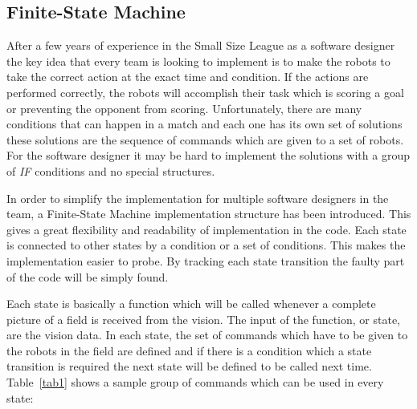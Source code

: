 \documentclass[runningheads]{llncs}
\begin{document}
\subsection{Finite-State Machine} 
After a few years of experience in the Small Size League as a software designer the key idea that every team is looking to implement is to make the robots to take the correct action at the exact time and condition. If the actions are performed correctly, the robots will accomplish their task which is scoring a goal or preventing the opponent from scoring. Unfortunately, there are many conditions that can happen in a match and each one has its own set of solutions these solutions are the sequence of commands which are given to a set of robots. For the software designer it may be hard to implement the solutions with a group of \textit{IF} conditions and no special structures.

In order to simplify the implementation for multiple software designers in the team, a Finite-State Machine implementation structure has been introduced. This gives a great flexibility and readability of implementation in the code. Each state is connected to other states by a condition or a set of conditions. This makes the implementation easier to probe. By tracking each state transition the faulty part of the code will be simply found.

Each state is basically a function which will be called whenever a complete picture of a field is received from the vision. The input of the function, or state, are the vision data.  
In each state, the set of commands which have to be given to the robots in the field are defined and if there is a condition which a state transition is required the next state will be defined to be called next time.
Table~\ref{tab1} shows a sample group of commands which can be used in every state:
\end{document}
